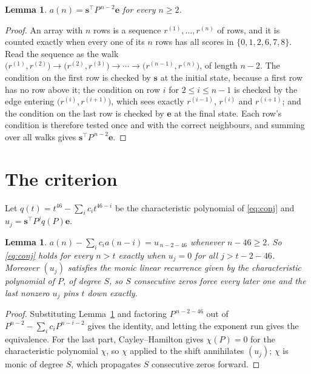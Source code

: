 \documentclass[11pt,a4paper]{article}
\theoremstyle{plain}
\newtheorem{lemma}[theorem]{Lemma}
\theoremstyle{definition}
\begin{document}
\begin{lemma}\label{lem:walk}
$a(n)=\mathbf{s}^{\!\top}P^{\,n-2}\mathbf{e}$ for every $n\ge2$.
\end{lemma}

\begin{proof}
An array with $n$ rows is a sequence $r^{(1)},\dots,r^{(n)}$ of rows, and it is counted
exactly when every one of its $n$ rows has all scores in $\{0,1,2,6,7,8\}$. Read the sequence as the
walk $\bigl(r^{(1)},r^{(2)}\bigr)\to\bigl(r^{(2)},r^{(3)}\bigr)\to\cdots\to
\bigl(r^{(n-1)},r^{(n)}\bigr)$, of length $n-2$. The condition on the first row is
checked by $\mathbf{s}$ at the initial state, because a first row has no row above it; the
condition on row $i$ for $2\le i\le n-1$ is checked by the edge entering
$\bigl(r^{(i)},r^{(i+1)}\bigr)$, which sees exactly $r^{(i-1)}$, $r^{(i)}$ and
$r^{(i+1)}$; and the condition on the last row is checked by $\mathbf{e}$ at the final
state. Each row's condition is therefore tested once and with the correct neighbours, and
summing over all walks gives $\mathbf{s}^{\!\top}P^{\,n-2}\mathbf{e}$.
\end{proof}

\section{The criterion}

Let $q(t)=t^{46}-\sum_i c_i t^{46-i}$ be the characteristic polynomial of
\eqref{eq:conj} and $u_j=\mathbf{s}^{\!\top}P^{j}q(P)\mathbf{e}$.

\begin{lemma}\label{lem:crit}
$a(n)-\sum_i c_i a(n-i)=u_{\,n-2-46}$ whenever $n-46\ge2$. So \eqref{eq:conj}
holds for every $n>t$ exactly when $u_j=0$ for all $j>t-2-46$. Moreover $(u_j)$
satisfies the monic linear recurrence given by the characteristic polynomial of $P$, of
degree $S$, so $S$ consecutive zeros force every later one and the last nonzero $u_j$ pins
$t$ down exactly.
\end{lemma}

\begin{proof}
Substituting Lemma~\ref{lem:walk} and factoring $P^{\,n-2-46}$ out of
$P^{n-2}-\sum_i c_i P^{n-i-2}$ gives the identity, and letting the exponent run gives the
equivalence. For the last part, Cayley--Hamilton gives $\chi(P)=0$ for the characteristic
polynomial $\chi$, so $\chi$ applied to the shift annihilates $(u_j)$; $\chi$ is monic of
degree $S$, which propagates $S$ consecutive zeros forward.
\end{proof}
\end{document}
